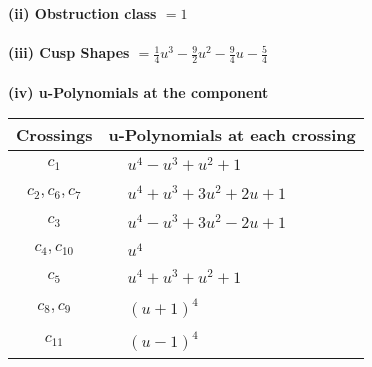 \documentclass[1p]{elsarticle_modified}
\theoremstyle{definition}
\begin{document}
\flushleft \textbf{(ii) Obstruction class $= 1$}\\~\\
\flushleft \textbf{(iii) Cusp Shapes $= \frac{1}{4} u^3-\frac{9}{2} u^2-\frac{9}{4} u-\frac{5}{4}$}\\~\\
\newpage\renewcommand{\arraystretch}{1}
\flushleft \textbf{(iv) u-Polynomials at the component}\newline \\
\begin{tabular}{m{50pt}|m{274pt}}
Crossings & \hspace{64pt}u-Polynomials at each crossing \\
\hline $$\begin{aligned}c_{1}\end{aligned}$$&$\begin{aligned}
&u^4- u^3+u^2+1
\end{aligned}$\\
\hline $$\begin{aligned}c_{2},c_{6},c_{7}\end{aligned}$$&$\begin{aligned}
&u^4+u^3+3 u^2+2 u+1
\end{aligned}$\\
\hline $$\begin{aligned}c_{3}\end{aligned}$$&$\begin{aligned}
&u^4- u^3+3 u^2-2 u+1
\end{aligned}$\\
\hline $$\begin{aligned}c_{4},c_{10}\end{aligned}$$&$\begin{aligned}
&u^4
\end{aligned}$\\
\hline $$\begin{aligned}c_{5}\end{aligned}$$&$\begin{aligned}
&u^4+u^3+u^2+1
\end{aligned}$\\
\hline $$\begin{aligned}c_{8},c_{9}\end{aligned}$$&$\begin{aligned}
&(u+1)^4
\end{aligned}$\\
\hline $$\begin{aligned}c_{11}\end{aligned}$$&$\begin{aligned}
&(u-1)^4
\end{aligned}$\\
\hline
\end{tabular}\\~\\
\end{document}
